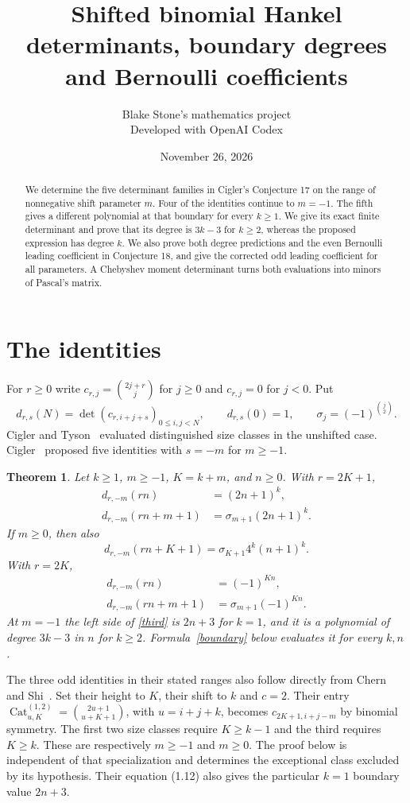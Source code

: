\documentclass[11pt]{article}
\title{Shifted binomial Hankel determinants, boundary degrees and Bernoulli coefficients}
\author{Blake Stone's mathematics project\\ \small Developed with OpenAI Codex}
\date{November 26, 2026}
\newtheorem{theorem}{Theorem}
\begin{document}
\maketitle
\begin{abstract}
We determine the five determinant families in Cigler's Conjecture 17 on the range of nonnegative shift parameter $m$. Four of the identities continue to $m=-1$. The fifth gives a different polynomial at that boundary for every $k\ge1$. We give its exact finite determinant and prove that its degree is $3k-3$ for $k\ge2$, whereas the proposed expression has degree $k$. We also prove both degree predictions and the even Bernoulli leading coefficient in Conjecture 18, and give the corrected odd leading coefficient for all parameters. A Chebyshev moment determinant turns both evaluations into minors of Pascal's matrix.
\end{abstract}

\section{The identities}
For $r\ge0$ write $c_{r,j}=\binom{2j+r}{j}$ for $j\ge0$ and $c_{r,j}=0$ for $j<0$. Put
\[
 d_{r,s}(N)=\det(c_{r,i+j+s})_{0\le i,j<N},\qquad d_{r,s}(0)=1,\qquad
 \sigma_j=(-1)^{\binom j2}.
\]
Cigler and Tyson~\cite{ct} evaluated distinguished size classes in the unshifted case. Cigler~\cite[\S4, Conjecture 17]{cigler} proposed five identities with $s=-m$ for $m\ge-1$.
\begin{theorem}\label{main}
Let $k\ge1$, $m\ge-1$, $K=k+m$, and $n\ge0$. With $r=2K+1$,
\begin{align}
 d_{r,-m}(rn)&=(2n+1)^k,\label{odd0}\\
 d_{r,-m}(rn+m+1)&=\sigma_{m+1}(2n+1)^k.\label{odd1}
\end{align}
If $m\ge0$, then also
\begin{equation}\label{third}
 d_{r,-m}(rn+K+1)=\sigma_{K+1}4^k(n+1)^k.
\end{equation}
With $r=2K$,
\begin{align}
 d_{r,-m}(rn)&=(-1)^{Kn},\label{even0}\\
 d_{r,-m}(rn+m+1)&=\sigma_{m+1}(-1)^{Kn}.\label{even1}
\end{align}
At $m=-1$ the left side of \eqref{third} is $2n+3$ for $k=1$, and it is a polynomial of degree $3k-3$ in $n$ for $k\ge2$. Formula~\eqref{boundary} below evaluates it for every $k,n$.
\end{theorem}
The three odd identities in their stated ranges also follow directly from Chern and Shi~\cite[Theorem 1.9 and (7.1)]{cs}. Set their height to $K$, their shift to $k$ and $c=2$. Their entry $\operatorname{Cat}^{(1,2)}_{u,K}=\binom{2u+1}{u+K+1}$, with $u=i+j+k$, becomes $c_{2K+1,i+j-m}$ by binomial symmetry. The first two size classes require $K\ge k-1$ and the third requires $K\ge k$. These are respectively $m\ge-1$ and $m\ge0$. The proof below is independent of that specialization and determines the exceptional class excluded by its hypothesis. Their equation (1.12) also gives the particular $k=1$ boundary value $2n+3$.
\end{document}
